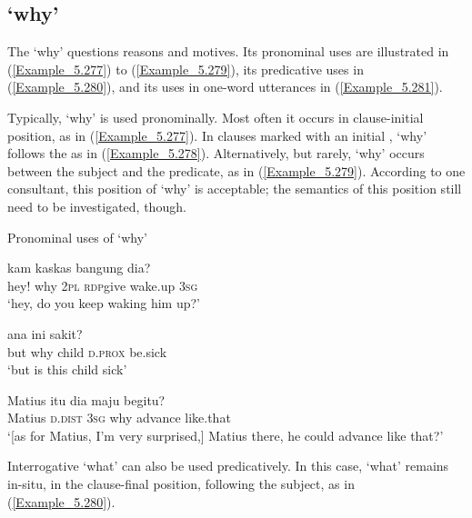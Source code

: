 \subsection{ ‘why’}
\label{Para_5.8.6}
The   ‘why’ questions reasons and motives. Its pronominal uses are illustrated in (\ref{Example_5.277}) to (\ref{Example_5.279}), its predicative uses in (\ref{Example_5.280}), and its uses in one-word utterances in (\ref{Example_5.281}).



Typically,  ‘why’ is used pronominally. Most often it occurs in clause-initial position, as in (\ref{Example_5.277}). In clauses marked with an initial ,  ‘why’ follows the  as in (\ref{Example_5.278}). Alternatively, but rarely,  ‘why’ occurs between the subject and the predicate, as in (\ref{Example_5.279}). According to one consultant, this position of  ‘why’ is acceptable; the semantics of this position still need to be investigated, though.


\begin{styleExampleTitle}
Pronominal uses of  ‘why’
\end{styleExampleTitle}

\ea
\label{Example_5.277}
 {} {kam} {kas{\Tilde}kas} {bangung} {dia?}\\ %
 hey!  why  \textsc{2pl}  \textsc{rdp}{\Tilde}give  wake.up  \textsc{3sg}\\
\glt 
‘hey,  do you keep waking him up?’ \textstyleExampleSource{[080918-001-CvNP.0039]}
\z

\ea
\label{Example_5.278}
 {} {ana} {ini} {sakit?}\\ %
 but  why  child  \textsc{d.prox}  be.sick\\
\glt 
‘but  is this child sick’ \textstyleExampleSource{[080917-010-CvEx.0133]}
\z

\ea
\label{Example_5.279}
\gll {{\ldots}} {Matius} {itu} {dia} {} {maju} {begitu?}\\ %
 { }   Matius  \textsc{d.dist}  \textsc{3sg}  why  advance  like.that\\
\glt 
‘[as for Matius, I’m very surprised,] Matius there,  he could advance like that?’ \textstyleExampleSource{[081006-032-Cv.0025]}
\z


Interrogative  ‘what’ can also be used predicatively. In this case,  ‘what’ remains in-situ, in the clause-final position, following the subject, as in (\ref{Example_5.280}).


